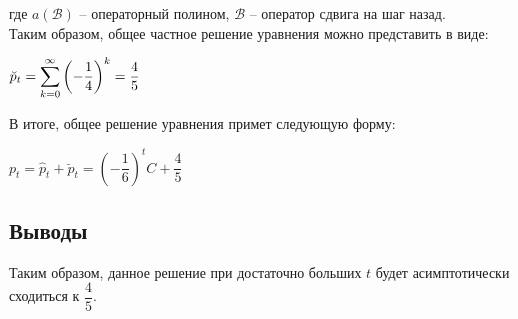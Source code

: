\documentclass[14pt,fleqn]{extarticle}
\begin{document}
	где $a(\mathcal{B})$ -- операторный полином, $\mathcal{B}$ -- оператор сдвига на шаг назад.\\
	Таким образом, общее частное решение уравнения можно представить в виде:
	\begin{center}
		$\breve{p}_t = \smashoperator[r]{\sum_{k=0}^{\infty}}\left(-\dfrac{1}{4}\right)^k = \dfrac{4}{5}$
	\end{center}
	В итоге, общее решение уравнения примет следующую форму:
	\begin{center}
		$p_t = \hat{p}_t + \breve{p}_t = \left(-\dfrac{1}{6}\right)^tC + \dfrac{4}{5}$
	\end{center}
	\subsection*{Выводы}
	Таким образом, данное решение при достаточно больших $t$ будет асимптотически сходиться к $\dfrac{4}{5}$.
\end{document}
